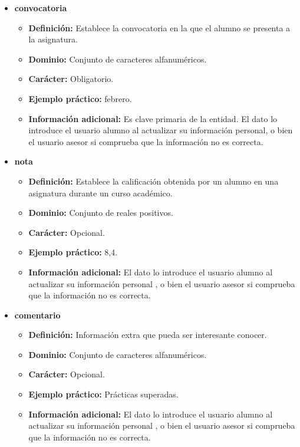 \begin{description}
   \begin{itemize}
    \item \textbf{convocatoria}
    \begin{itemize}
      \item \textbf{Definición:} Establece la convocatoria en la que el
      alumno se presenta a la asignatura.
      \item \textbf{Dominio:} Conjunto de caracteres alfanuméricos.
      \item \textbf{Carácter:} Obligatorio.
      \item \textbf{Ejemplo práctico:} febrero.
      \item \textbf{Información adicional:} Es clave primaria de la
      entidad. El dato lo introduce el usuario alumno al actualizar
      su información personal, o bien el usuario asesor si
      comprueba que la información no es correcta.
    \end{itemize}
    \item \textbf{nota}
    \begin{itemize}
      \item \textbf{Definición:} Establece la calificación obtenida por un
      alumno en una asignatura durante un curso académico.
      \item \textbf{Dominio:} Conjunto de reales positivos.
      \item \textbf{Carácter:} Opcional.
      \item \textbf{Ejemplo práctico:} 8,4.
      \item \textbf{Información adicional:} El dato lo introduce el
      usuario alumno al actualizar su información personal , o
      bien el usuario asesor si comprueba que la información no es
      correcta.
    \end{itemize}
    \item \textbf{comentario}
    \begin{itemize}
      \item \textbf{Definición:} Información extra que pueda ser
      interesante conocer.
      \item \textbf{Dominio:} Conjunto de caracteres alfanuméricos.
      \item \textbf{Carácter:} Opcional.
      \item \textbf{Ejemplo práctico:} Prácticas superadas.
      \item \textbf{Información adicional:} El dato lo introduce el
      usuario alumno al actualizar su información personal , o
      bien el usuario asesor si comprueba que la información no es
      correcta.
    \end{itemize}
   \end{itemize}


\end{description}
